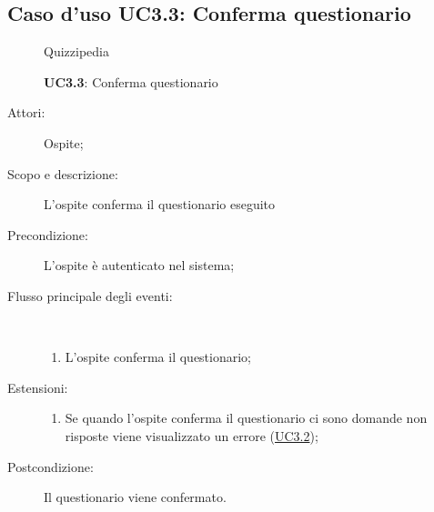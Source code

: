 \subsection{Caso d'uso UC3.3: Conferma questionario}
\begin{figure}[H]
	\centering
	\begin{resizedtikzpicture}{\textwidth}
		\begin{umlsystem}[x=0, fill=lightgray!20]{Quizzipedia}
		\end{umlsystem}
	\end{resizedtikzpicture}
	\caption{\textbf{UC3.3}: Conferma questionario}
	\label{UC3.3}
\end{figure}
\begin{description}
	\item[Attori:] Ospite;
	\item[Scopo e descrizione:] L'ospite conferma il questionario eseguito
	\item[Precondizione:] L'ospite è autenticato nel sistema;
	
	\item[Flusso principale degli eventi:] \ 
	\begin{enumerate}
		\item L'ospite conferma il questionario;
		
	\end{enumerate}
	\item[Estensioni:]
	\begin{enumerate}
		\item Se quando l'ospite conferma il questionario ci sono domande non risposte viene visualizzato un errore (\hyperlink{UC3.2}{UC3.2});
		
	\end{enumerate}
	\item[Postcondizione:] Il questionario viene confermato.
\end{description}
\hypertarget{UC3.4}{}
